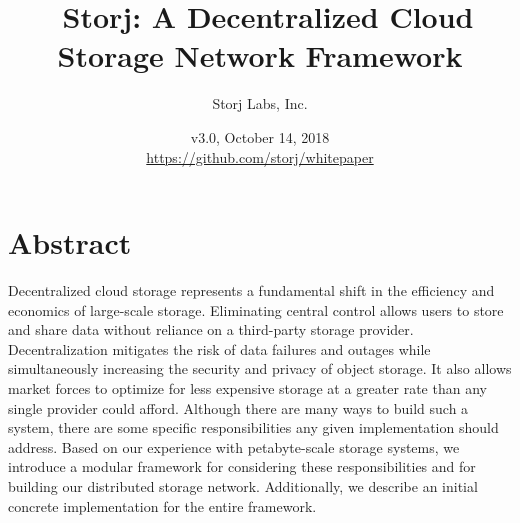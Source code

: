 \documentclass[8pt,fleqn,openany]{book}
\title{\textbf{\sffamily\color{white} \
Storj: A Decentralized Cloud Storage Network Framework}}
\author{\small\sffamily\color{white}
Storj Labs, Inc.}
\date{\small\sffamily\color{white} v3.0, October 14, 2018\\
\small\colorlet{urllinkcolor}{white}\url{https://github.com/storj/whitepaper}
}
\begin{document}
\raggedbottom
{}

\thispagestyle{fancy}

\maketitle


\newpage

\tableofcontents\newpage

\section{Abstract}

Decentralized cloud storage represents a fundamental shift in
the efficiency and economics of large-scale storage.
Eliminating central control allows users to store and share data
without reliance on a third-party storage provider. Decentralization mitigates
the risk of data failures and outages while simultaneously increasing
the security and privacy of object storage. It also
allows market forces to optimize for less expensive storage
at a greater rate than any single provider could afford.
Although there are many ways to build such a system, there are some specific
responsibilities any given implementation should address.
Based on our experience with petabyte-scale
storage systems, we introduce a modular framework for considering these
responsibilities and for building our distributed storage network.
Additionally, we describe an initial
concrete implementation for the entire framework.
\end{document}
